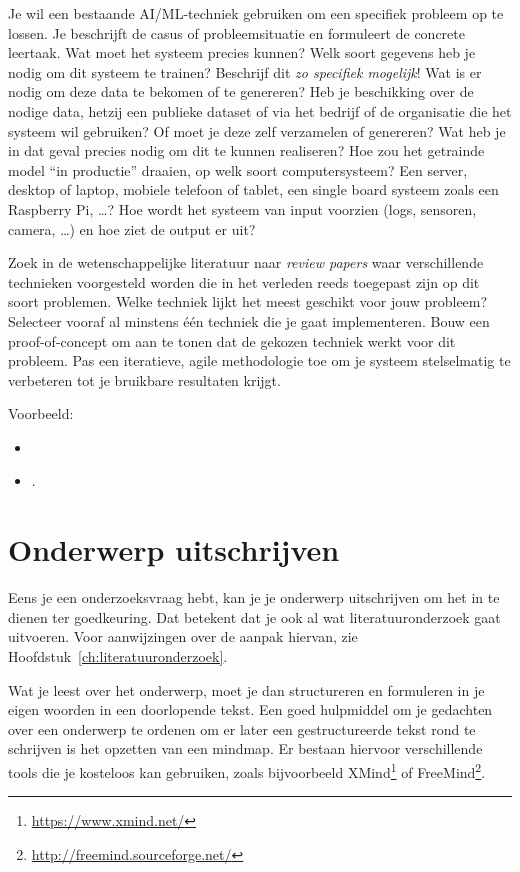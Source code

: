 Je wil een bestaande AI/ML-techniek gebruiken om een specifiek probleem op te lossen. Je beschrijft de casus of probleemsituatie en formuleert de concrete leertaak. Wat moet het systeem precies kunnen? Welk soort gegevens heb je nodig om dit systeem te trainen? Beschrijf dit \emph{zo specifiek mogelijk}! Wat is er nodig om deze data te bekomen of te genereren? Heb je beschikking over de nodige data, hetzij een publieke dataset of via het bedrijf of de organisatie die het systeem wil gebruiken? Of moet je deze zelf verzamelen of genereren? Wat heb je in dat geval precies nodig om dit te kunnen realiseren? Hoe zou het getrainde model ``in productie'' draaien, op welk soort computersysteem? Een server, desktop of laptop, mobiele telefoon of tablet, een single board systeem zoals een Raspberry Pi, \ldots? Hoe wordt het systeem van input voorzien (logs, sensoren, camera, \ldots) en hoe ziet de output er uit?

Zoek in de wetenschappelijke literatuur naar \emph{review papers} waar verschillende technieken voorgesteld worden die in het verleden reeds toegepast zijn op dit soort problemen. Welke techniek lijkt het meest geschikt voor jouw probleem? Selecteer vooraf al minstens één techniek die je gaat implementeren. Bouw een proof-of-con\-cept om aan te tonen dat de gekozen techniek werkt voor dit probleem. Pas een iteratieve, agile methodologie toe om je systeem stelselmatig te verbeteren tot je bruikbare resultaten krijgt.

Voorbeeld:

\begin{itemize}
  \item {} \autocite{Opsommer2020}
  \item {} \autocite{Cluyse2023}.
\end{itemize}

\section{Onderwerp uitschrijven}%
\label{sec:onderwerp_uitschrijven}

Eens je een onderzoeksvraag hebt, kan je je onderwerp uitschrijven om het in te dienen ter goedkeuring. Dat betekent dat je ook al wat literatuuronderzoek gaat uitvoeren. Voor aanwijzingen over de aanpak hiervan, zie Hoofdstuk~\ref{ch:literatuuronderzoek}.

Wat je leest over het onderwerp, moet je dan structureren en formuleren in je eigen woorden in een doorlopende tekst. Een goed hulpmiddel om je gedachten over een onderwerp te ordenen om er later een gestructureerde tekst rond te schrijven is het opzetten van een mindmap. Er bestaan hiervoor verschillende tools die je kosteloos kan gebruiken, zoals bijvoorbeeld XMind\footnote{\url{https://www.xmind.net/}} of FreeMind\footnote{\url{http://freemind.sourceforge.net/}}.

